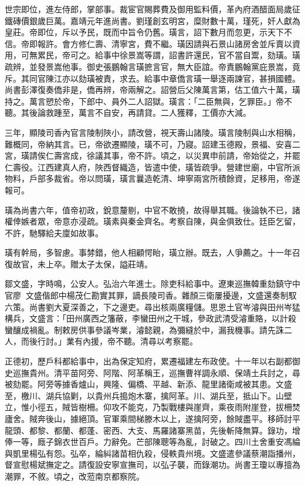\begin{pinyinscope}
世宗即位，進左侍郎，掌部事。裁宦官賜葬費及御用監料價，革內府酒醋面局歲征鐵磚價銀歲巨萬。嘉靖元年進尚書。劉瑾創玄明宮，糜財數十萬，瑾死，奸人獻為皇莊。帝即位，斥以予民，既而中旨令仍舊。璜言，詔下數月而忽更，示天下不信。帝即報許。會方修仁壽、清寧宮，費不繼。璜因請與石景山諸房舍並斥賣以資用，可無累民，帝可之。給事中徐景嵩等謂，詔書許還民，官不當自鬻，劾璜。璜疏辨，並發景嵩他事。御史張鵬翰言璜摭言官，無大臣誼。帝責鵬翰黨庇景嵩，竟斥。其同官陳江亦以劾璜被責，求去。給事中章僑言璜一舉逐兩諫官，甚損國體。尚書彭澤復奏僑非是，僑再辨，帝兩解之。詔營后父陳萬言第，估工值六十萬，璜持之。萬言愬於帝，下郎中、員外二人詔獄。璜言：「二臣無與，乞罪臣。」帝不聽。其後論救踵至，萬言不自安，再請貸。二人獲釋，工價亦大減。

三年，顯陵司香內官言陵制陜小，請改營，視天壽山諸陵。璜言陵制與山水相稱，難概同，帝納其言。已，帝欲遷顯陵，璜不可，乃寢。詔建玉德殿，景福、安喜二宮，璜請俟仁壽宮成，徐議其事，帝不許。頃之，以災異申前請，帝始從之，并罷仁壽役。江西建真人府，陜西督織造，皆遣中使，璜皆疏爭。營建世廟，中官所派物料，戶部多裁省。帝以問璜，璜言曩造乾清、坤寧兩宮所積餘資，足移用，帝遂報可。

璜為尚書六年，值帝初政，銳意釐剔，中官不敢撓，故得舉其職。後論執不已，諸權倖嫉者眾，帝意亦浸疏。璜素與秦金齊名。考察自陳，與金俱致仕。廷臣乞留，不許，馳驛給夫廩如故事。

璜有幹局，多智慮。事棼錯，他人相顧愕眙，璜立辦。既去，人爭薦之。十一年召復故官，未上卒。贈太子太保，謚莊靖。

鄒文盛，字時鳴，公安人。弘治六年進士。除吏科給事中。遼東巡撫韓重劾鎮守中官廖，文盛偕郎中楊茂仁勘實其罪，謫長陵司香。雜顏三衛屢擾邊，文盛還奏制馭六策。尚書劉大夏深善之，下之邊吏。尋出核兩廣糧儲。思恩土官岑濬與田州岑猛構兵，文盛言：「田州廣西之籓蔽，李蠻田州之干城，參政武清受濬重賂，以計殺蠻釀成禍亂。制敕房供事參議岑業，濬懿親，為彌縫於中，漏我機事。請先誅二人，而後行討。」業有內援，帝不聽。清尋以考察罷。

正德初，歷戶科都給事中，出為保定知府，累遷福建左布政使。十一年以右副都御史巡撫貴州。清平苗阿旁、阿階、阿革稱王，巡撫曹祥調永順、保靖土兵討之，尋被劾罷。阿旁等據香爐山，興隆、偏橋、平越、新添、龍里諸衛咸被其患。文盛至，檄川、湖兵協剿，以貴州兵搗炮木寨，擒阿革。川、湖兵至，抵山下。山壁立，惟小徑五，賊皆樹柵。仰攻不能克，乃製戰樓與崖齊，乘夜雨附崖登，拔柵焚廬舍。賊奔後山，據絕頂。官軍乘間梯滕木以上，遂擒阿旁，餘賊盡平。移師討平龍頭、都黎、都蘭、都蓬、密西、大支、馬羅諸寨黑苗，先後斬降無算。錄功，增俸一等，廕子錦衣世百戶。力辭免。芒部陳聰等為亂，討破之。四川土舍重安馮綸與凱里楊弘有怨。弘卒，綸糾諸苗相仇殺，侵軼貴州境。文盛遣參議蔡潮詣播州，督宣慰楊斌撫定之。請復設安寧宣撫司，以弘子襲，而錄潮功。尚書王瓊以專擅為潮罪，不敘。頃之，改蒞南京都察院。


\end{pinyinscope}
